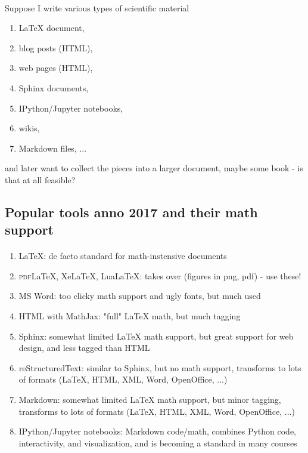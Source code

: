 \documentclass[%
oneside,                 %
final,                   %
10pt]{article}
\begin{document}
\paragraph{}
Suppose I write various types of scientific material
\begin{enumerate}
\item {\LaTeX} document,

\item blog posts (HTML),

\item web pages (HTML),

\item Sphinx documents,

\item IPython/Jupyter notebooks,

\item wikis,

\item Markdown files, ...
\end{enumerate}

\noindent
and later want to collect the pieces into a larger document, maybe some book - is that at all feasible?




\subsection{Popular tools anno 2017 and their math support}

\paragraph{}
\begin{enumerate}
\item {\LaTeX}: de facto standard for math-instensive documents

\item \textsc{pdf}{\LaTeX}, XeLaTeX, LuaLaTeX: takes over (figures in png, pdf) - use these!

\item MS Word: too clicky math support and ugly fonts, but much used

\item HTML with MathJax: "full" {\LaTeX} math, but much tagging

\item Sphinx: somewhat limited {\LaTeX} math support, but great support for web design, and less tagged than HTML

\item reStructuredText: similar to Sphinx, but no math support, transforms to lots of formats ({\LaTeX}, HTML, XML, Word, OpenOffice, ...)

\item Markdown: somewhat limited {\LaTeX} math support, but minor tagging, transforms to lots of formats ({\LaTeX}, HTML, XML, Word, OpenOffice, ...)

\item IPython/Jupyter notebooks: Markdown code/math, combines Python code, interactivity, and visualization, and is becoming a standard in many courses
\end{enumerate}
\end{document}
